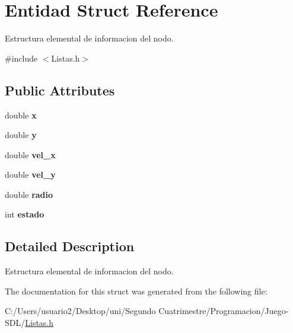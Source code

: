\hypertarget{struct_entidad}{}\section{Entidad Struct Reference}
\label{struct_entidad}


Estructura elemental de informacion del nodo.  




{\ttfamily \#include $<$Listas.\+h$>$}

\subsection*{Public Attributes}
\begin{DoxyCompactItemize}
\item 
double {\bfseries x}\hypertarget{struct_entidad_a9c2276d478cdaa686e13ea674ee39bbf}{}\label{struct_entidad_a9c2276d478cdaa686e13ea674ee39bbf}

\item 
double {\bfseries y}\hypertarget{struct_entidad_aa0fc15ed766abcc8564049e999f57cf1}{}\label{struct_entidad_aa0fc15ed766abcc8564049e999f57cf1}

\item 
double {\bfseries vel\+\_\+x}\hypertarget{struct_entidad_af1090c062eb00a43813ac9920bbfd877}{}\label{struct_entidad_af1090c062eb00a43813ac9920bbfd877}

\item 
double {\bfseries vel\+\_\+y}\hypertarget{struct_entidad_a071935b99734fb6455413872f423e1ed}{}\label{struct_entidad_a071935b99734fb6455413872f423e1ed}

\item 
double {\bfseries radio}\hypertarget{struct_entidad_a1440ee2033a1263c7a1e74f4aa481fec}{}\label{struct_entidad_a1440ee2033a1263c7a1e74f4aa481fec}

\item 
int {\bfseries estado}\hypertarget{struct_entidad_a322cf44494366259f64f43e03404ccf4}{}\label{struct_entidad_a322cf44494366259f64f43e03404ccf4}

\end{DoxyCompactItemize}


\subsection{Detailed Description}
Estructura elemental de informacion del nodo. 

The documentation for this struct was generated from the following file\+:\begin{DoxyCompactItemize}
\item 
C\+:/\+Users/usuario2/\+Desktop/uni/\+Segundo Cuatrimestre/\+Programacion/\+Juego-\/\+S\+D\+L/\hyperlink{_listas_8h}{Listas.\+h}\end{DoxyCompactItemize}
